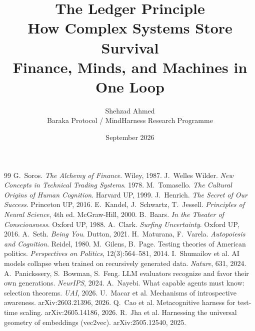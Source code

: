 \documentclass[11pt,openany]{book}
\title{The Ledger Principle\\[4pt]
\Large How Complex Systems Store Survival\\[4pt]
\normalsize Finance, Minds, and Machines in One Loop}
\author{Shehzad Ahmed \\ \small Baraka Protocol / MindHarness Research Programme}
\date{September 2026}
\begin{document}
\maketitle
\tableofcontents
\listoffigures
\listoftables
















\begin{thebibliography}{99}
 G.\ Soros. \textit{The Alchemy of Finance}. Wiley, 1987.
 J.\ Welles Wilder. \textit{New Concepts in Technical Trading Systems}. 1978.
 M.\ Tomasello. \textit{The Cultural Origins of Human Cognition}. Harvard UP, 1999.
 J.\ Henrich. \textit{The Secret of Our Success}. Princeton UP, 2016.
 E.\ Kandel, J.\ Schwartz, T.\ Jessell. \textit{Principles of Neural Science}, 4th ed. McGraw-Hill, 2000.
 B.\ Baars. \textit{In the Theater of Consciousness}. Oxford UP, 1988.
 A.\ Clark. \textit{Surfing Uncertainty}. Oxford UP, 2016.
 A.\ Seth. \textit{Being You}. Dutton, 2021.
 H.\ Maturana, F.\ Varela. \textit{Autopoiesis and Cognition}. Reidel, 1980.
 M.\ Gilens, B.\ Page. Testing theories of American politics. \textit{Perspectives on Politics}, 12(3):564--581, 2014.
 I.\ Shumailov et al. AI models collapse when trained on recursively generated data. \textit{Nature}, 631, 2024.
 A.\ Panickssery, S.\ Bowman, S.\ Feng. LLM evaluators recognize and favor their own generations. \textit{NeurIPS}, 2024.
 A.\ Nayebi. What capable agents must know: selection theorems. \textit{UAI}, 2026.
 U.\ Macar et al. Mechanisms of introspective awareness. arXiv:2603.21396, 2026.
 Q.\ Cao et al. Metacognitive harness for test-time scaling. arXiv:2605.14186, 2026.
 R.\ Jha et al. Harnessing the universal geometry of embeddings (vec2vec). arXiv:2505.12540, 2025.

\end{thebibliography}
\end{document}
